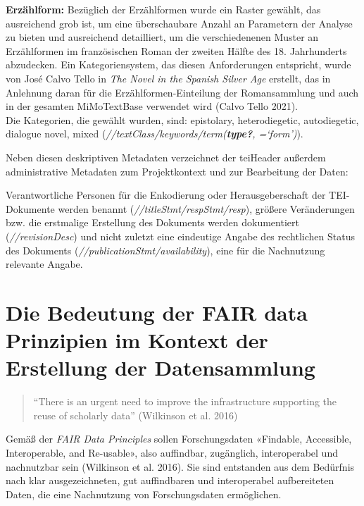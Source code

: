\documentclass[
  12pt,
  letterpaper,
  DIV=11,
  numbers=noendperiod]{scrreprt}
\begin{document}
\textbf{Erzählform:} Bezüglich der Erzählformen wurde ein Raster
gewählt, das ausreichend grob ist, um eine überschaubare Anzahl an
Parametern der Analyse zu bieten und ausreichend detailliert, um die
verschiedenenen Muster an Erzählformen im französischen Roman der
zweiten Hälfte des 18. Jahrhunderts abzudecken. Ein Kategoriensystem,
das diesen Anforderungen entspricht, wurde von José Calvo Tello in
\emph{The Novel in the Spanish Silver Age} erstellt, das in Anlehnung
daran für die Erzählformen-Einteilung der Romansammlung und auch in der
gesamten MiMoTextBase verwendet wird (Calvo Tello 2021).\\
Die Kategorien, die gewählt wurden, sind: epistolary, heterodiegetic,
autodiegetic, dialogue novel, mixed
(\emph{//textClass/keywords/term(\textbf{type?}, =`form')}).

Neben diesen deskriptiven Metadaten verzeichnet der teiHeader außerdem
administrative Metadaten zum Projektkontext und zur Bearbeitung der
Daten:

Verantwortliche Personen für die Enkodierung oder Herausgeberschaft der
TEI-Dokumente werden benannt (\emph{//titleStmt/respStmt/resp}), größere
Veränderungen bzw. die erstmalige Erstellung des Dokuments werden
dokumentiert (\emph{//revisionDesc}) und nicht zuletzt eine eindeutige
Angabe des rechtlichen Status des Dokuments
(\emph{//publicationStmt/availability}), eine für die Nachnutzung
relevante Angabe.

\section{Die Bedeutung der FAIR data Prinzipien im Kontext der
Erstellung der
Datensammlung}\label{die-bedeutung-der-fair-data-prinzipien-im-kontext-der-erstellung-der-datensammlung}

\begin{quote}
``There is an urgent need to improve the infrastructure supporting the
reuse of scholarly data'' (Wilkinson et al. 2016)
\end{quote}

Gemäß der \emph{FAIR Data Principles} sollen Forschungsdaten «Findable,
Accessible, Interoperable, and Re-usable», also auffindbar, zugänglich,
interoperabel und nachnutzbar sein (Wilkinson et al. 2016). Sie sind
entstanden aus dem Bedürfnis nach klar ausgezeichneten, gut auffindbaren
und interoperabel aufbereiteten Daten, die eine Nachnutzung von
Forschungsdaten ermöglichen.
\end{document}
